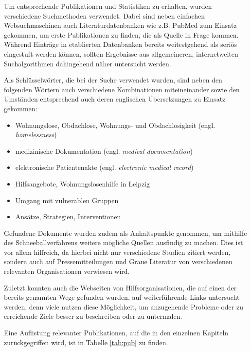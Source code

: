 Um entsprechende Publikationen und Statistiken zu erhalten, wurden verschiedene Suchmethoden verwendet. Dabei sind neben einfachen Websuchmaschinen auch Literaturdatenbanken wie z.B. PubMed zum Einsatz gekommen, um erste Publikationen zu finden, die als Quelle in Frage kommen. Während Einträge in etablierten Datenbanken bereits weitestgehend als seriös eingestuft werden können, sollten Ergebnisse aus allgemeineren, internetweiten Suchalgorithmen dahingehend näher untersucht werden.

Als Schlüsselwörter, die bei der Suche verwendet wurden, sind neben den folgenden Wörtern auch verschiedene Kombinationen miteineinander sowie den Umständen entsprechend auch deren englischen Übersetzungen zu Einsatz gekommen:

\begin{itemize}
	\item Wohnungslose, Obdachlose, Wohnungs- und Obdachlosigkeit (engl. \textit{homelessness})
	\item medizinische Dokumentation (engl. \textit{medical documentation})
	\item elektronische Patientenakte (engl. \textit{electronic medical record})
	\item Hilfsangebote, Wohnungslosenhilfe in Leipzig
	\item Umgang mit vulnerablen Gruppen
	\item Ansätze, Strategien, Interventionen
\end{itemize}

Gefundene Dokumente wurden zudem als Anhaltspunkte genommen, um mithilfe des Schneeballverfahrens weitere mögliche Quellen ausfindig zu machen. Dies ist vor allem hilfreich, da hierbei nicht nur verschiedene Studien zitiert werden, sondern auch auf Pressemitteilungen und Graue Literatur von verschiedenen relevanten Organisationen verwiesen wird.

Zuletzt konnten auch die Webseiten von Hilfsorganisationen, die auf einen der bereits genannten Wege gefunden wurden, auf weiterführende Links untersucht werden, denn viele nutzen diese Möglichkeit, um anzugehende Probleme oder zu erreichende Ziele besser zu beschreiben oder zu untermalen.

Eine Auflistung relevanter Publikationen, auf die in den einzelnen Kapiteln zurückgegriffen wird, ist in Tabelle \ref{tab:pub} zu finden.

